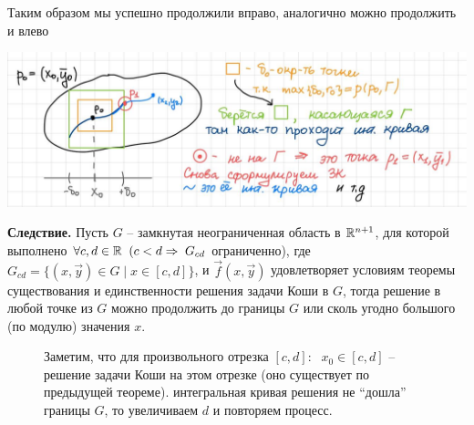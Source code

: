 Таким образом мы успешно продолжили вправо, аналогично можно продолжить и влево
\begin{center}
    \includegraphics[width=0.8\linewidth]{images/KoshiMainjpg.jpg} \quad \EndProof
\end{center}
\textbf{Следствие.} Пусть $G$ -- замкнутая неограниченная область в $\mathbb{R}^{n+1}$, для которой выполнено $\forall c, d \in \mathbb{R} \;\; (c < d \Rightarrow \; G_{cd}$ ограниченно), где $G_{cd} = \{(x, \vec{y}) \in G \;|\; x \in [c, d]\}$, и $\vec{f}(x, \vec{y})$
удовлетворяет условиям теоремы существования и единственности решения задачи Коши
в $G$, тогда решение в любой точке из $G$ можно продолжить до границы $G$ или сколь угодно
большого (по модулю) значения $x$.
\newline \begin{figure}[h]
    \hspace{-4ex} \begin{minipage}[h]{0.5\linewidth}
    \end{minipage}
    \hfill
    \begin{minipage}[h]{0.6\linewidth}
    \Proof Заметим, что для произвольного отрезка $[c, d]:$ \newline $\; x_0 \in [c,d]$  -- решение задачи Коши на этом отрезке \newline(оно существует по предыдущей теореме).  интегральная кривая
решения не “дошла”  границы $G$, то увеличиваем $d$ \newline и повторяем процесс.\quad \EndProof
    \end{minipage}
\end{figure}

